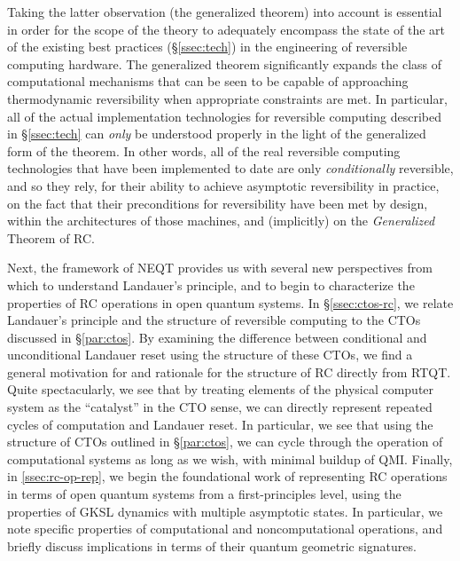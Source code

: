 \documentclass[preprints,article,accept,moreauthors,pdftex]{Definitions/mdpi}
\begin{document}
\begin{paracol}{2}
\begin{enumerate}
\end{enumerate}

Taking the latter observation (the generalized theorem) into account is essential in order for the scope of the theory to adequately encompass the state of the art of the existing best practices (\S\ref{ssec:tech}) in the engineering of reversible computing hardware. The generalized theorem significantly expands the class of computational mechanisms that can be seen to be capable of approaching thermodynamic reversibility when appropriate constraints are met. In particular, all of the actual implementation technologies for reversible computing described in \S\ref{ssec:tech} can \emph{only} be understood properly in the light of the generalized form of the theorem. In other words, all of the real reversible computing technologies that have been implemented to date are only \emph{conditionally} reversible, and so they rely, for their ability to achieve asymptotic reversibility in practice, on the fact that their preconditions for reversibility have been met by design, within the architectures of those machines, and (implicitly) on the \emph{Generalized} Theorem of RC.

Next, the framework of NEQT provides us with several new perspectives from which to understand Landauer's principle, and to begin to characterize the properties of RC operations in open quantum systems. In \S\ref{ssec:ctos-rc}, we relate Landauer's principle and the structure of reversible computing to the CTOs discussed in \S\ref{par:ctos}. By examining the difference between conditional and unconditional Landauer reset using the structure of these CTOs, we find a general motivation for and rationale for the structure of RC directly from RTQT. Quite spectacularly, we see that by treating elements of the physical computer system as the ``catalyst'' in the CTO sense, we can directly represent repeated cycles of computation and Landauer reset. In particular, we see that using the structure of CTOs outlined in \S\ref{par:ctos}, we can cycle through the operation of computational systems as long as we wish, with minimal buildup of QMI. Finally, in \ref{ssec:rc-op-rep}, we begin the foundational work of representing RC operations in terms of open quantum systems from a first-principles level, using the properties of GKSL dynamics with multiple asymptotic states. In particular, we note specific properties of computational and noncomputational operations, and briefly discuss implications in terms of their quantum geometric signatures.


\end{paracol}
\end{document}
